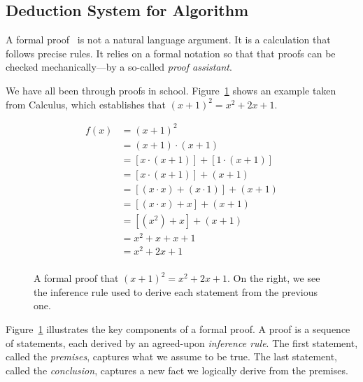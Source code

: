 \documentclass{aldast}
\begin{document}
\subsection{Deduction System for Algorithm}

A formal proof~\cite{harrison2008} is not a natural language argument. It
is a calculation that follows precise rules. It relies on a formal
notation so that that proofs can be checked mechanically---by a so-called
\emph{proof assistant}.

We have all been through proofs in
school. Figure~\ref{fig:formal-proof} shows an example taken from
Calculus, which establishes that $(x+1)^2 = x^2 + 2x + 1$.

\begin{figure}[htbp]
  \begin{minipage}[]{0.95\textwidth}
    \begin{align*}
      f(x) &= (x+1)^2 \\
           &= (x+1) \cdot (x+1) \tag{definition of square} \\
           &= [x\cdot(x+1)] + [1\cdot(x+1)] \tag{distributivity of $\times$ over $+$} \\
           &= [x\cdot(x+1)] + (x+1) \tag{neutral element of $\times$} \\
           &= [(x \cdot x)+ (x \cdot 1)] + (x+1) \tag{distributivity of $\times$ over $+$} \\
           &= [(x \cdot x)+ x] + (x+1) \tag{neutral element of $\times$} \\
           &= [(x^2)+ x] + (x+1) \tag{definition of square} \\
           &= x^2+ x + x + 1 \tag{associativity of $+$} \\
           &= x^2+ 2x + 1 \tag{factorization} \\
    \end{align*}
  \end{minipage}
  \caption{A formal proof that $(x+1)^2 = x^2 + 2x +1$. On the right,
    we see the inference rule used to derive each statement from the
    previous one.}
  \label{fig:formal-proof}
\end{figure}

Figure~\ref{fig:formal-proof} illustrates the key components of a
formal proof. A proof is a sequence of statements, each derived by an
agreed-upon \emph{inference rule}. The first statement, called the
\emph{premises}, captures what we assume to be true. The last
statement, called the \emph{conclusion}, captures a new fact we
logically derive from the premises.
\end{document}
